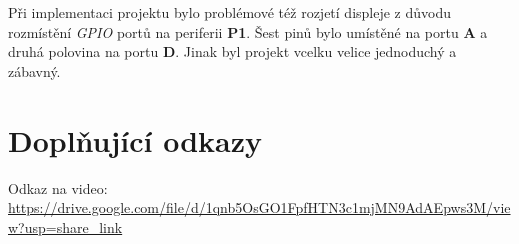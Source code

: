 \documentclass[a4paper,11pt]{article}
\begin{document}
    Při implementaci projektu bylo problémové též rozjetí displeje z důvodu rozmístění \emph{GPIO} portů na periferii \textbf{P1}.
    Šest pinů bylo umístěné na portu \textbf{A} a druhá polovina na portu \textbf{D}. Jinak byl projekt vcelku velice jednoduchý a zábavný. 

    \section{Doplňující odkazy}
    Odkaz na video: \url{https://drive.google.com/file/d/1qnb5OsGO1FpfHTN3c1mjMN9AdAEpws3M/view?usp=share_link}
\end{document}

